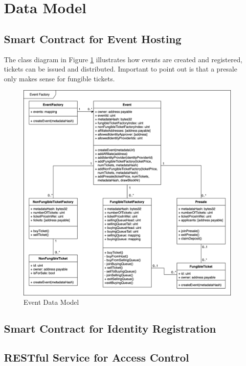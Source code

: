 \section{Data Model}


\subsection{Smart Contract for Event Hosting}
The class diagram in Figure \ref{fig:event-data-model} illustrates how events are created and registered, tickets can be issued and distributed. Important to point out is that a presale only makes sense for fungible tickets. 
\begin{figure}[H]
    \centering
    \includegraphics[width=16cm]{design/diagrams/event-factory-class-diagramm.png}
    \caption{Event Data Model}
    \label{fig:event-data-model}
\end{figure}

\subsection{Smart Contract for Identity Registration}

\subsection{RESTful Service for Access Control}
